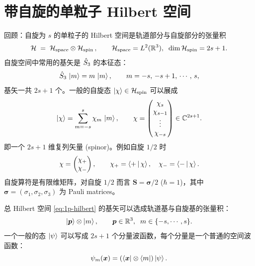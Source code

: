 \section{带自旋的单粒子 Hilbert 空间}\label{sec:1p-spin-hilbert}

回顾：自旋为 $s$ 的单粒子的 Hilbert 空间是轨道部分与自旋部分的张量积
\begin{equation}
  \mathcal{H} \;=\; \mathcal{H}_{\rm space} \otimes \mathcal{H}_{\rm spin}\,, \qquad
  \mathcal{H}_{\rm space}=L^2(\mathbb{R}^3),\;\; \dim\mathcal{H}_{\rm spin}=2s+1.
  \label{eq:1p-hilbert}
\end{equation}
自旋空间中常用的基矢是 $\hat{S}_3$ 的本征态：
\begin{equation}
  \hat{S}_3\, \ket{m} = m\,\ket{m},\qquad m=-s,\,-s+1,\,\cdots,\,s,
  \label{eq:S3-basis}
\end{equation}
基矢一共 $2s+1$ 个。一般的自旋态 $\ket{\chi}\in\mathcal{H}_{\rm spin}$ 可以展成
\begin{equation}
  \ket{\chi}=\sum_{m=-s}^{s}\chi_m\,\ket{m},
  \qquad
  \chi=\begin{pmatrix}\chi_s\\ \chi_{s-1}\\ \vdots\\ \chi_{-s}\end{pmatrix}\in\mathbb{C}^{2s+1}.
  \label{eq:spinor-column}
\end{equation}
即一个 $2s+1$ 维复列矢量 (spinor)。例如自旋 $1/2$ 时
\begin{equation}
  \chi=\begin{pmatrix}\chi_+\\ \chi_-\end{pmatrix},\qquad
  \chi_+=\left\langle + \,\middle|\, \chi \right\rangle,\quad \chi_-=\left\langle - \,\middle|\, \chi \right\rangle.
\end{equation}
自旋算符是有限维矩阵，对自旋 $1/2$ 而言 $\bm S=\bm\sigma/2$ ($\hbar=1$)，其中 $\bm\sigma=(\sigma_1,\sigma_2,\sigma_3)$ 为 Pauli matrices。

总 Hilbert 空间 \eqref{eq:1p-hilbert} 的基矢可以选成轨道基与自旋基的张量积：
\begin{equation}
  \ket{\bm p}\otimes\ket{m},\qquad \bm p\in\mathbb{R}^3,\;\; m\in\{-s,\cdots,s\}.
  \label{eq:basis-1p-spin}
\end{equation}
一个一般的态 $\ket\psi$ 可以写成 $2s+1$ 个分量波函数，每个分量是一个普通的空间波函数：
\begin{equation}
  \psi_m(\bm x)=(\bra{\bm x}\otimes\bra{m})\ket\psi.
\end{equation}

